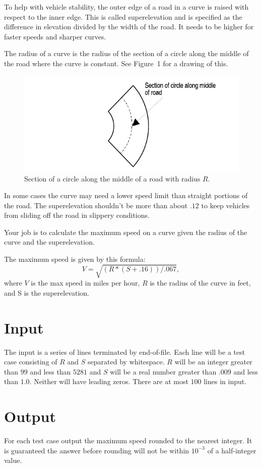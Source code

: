 
To help with vehicle stability, the outer edge of a road in a curve
is raised with respect to the inner edge. This is called superelevation
and is specified as the difference in elevation divided by the width 
of the road. It needs to be higher for faster speeds and sharper curves.

The radius of a curve is the radius of the section of a circle along the
middle of the road where the curve is constant. See Figure~1 for a
drawing of this.

\begin{figure}[h]
	\begin{center}
		\includegraphics[width=.65\textwidth]{F1CurveSpeed.pdf}
	\end{center}
	\caption{Section of a circle along the middle of a road with radius $R$.}
	\label{fig:1}
\end{figure}

In some cases the curve may need a lower speed limit than straight
portions of the road. The superelevation shouldn't be more than about
$.12$ to keep vehicles from sliding off the road in slippery conditions.

Your job is to calculate the maximum speed on a curve given the radius
of the curve and the superelevation.

The maximum speed is given by this formula:
$$V = \sqrt{(R*(S+.16))/.067},$$
where $V$ is the max speed in miles per hour, $R$ is the radius of the curve
in feet, and S is the superelevation.

\section*{Input}

The input is a series of lines terminated by end-of-file. Each line
will be a test case consisting of $R$ and $S$ separated by whitespace. $R$
will be an integer greater than $99$ and less than $5281$ and $S$ will be a 
real number greater than $.009$ and less than $1.0$. Neither will have 
leading zeros. There are at most $100$ lines in input.

\section*{Output}

For each test case output the maximum speed rounded to the nearest
integer. It is guaranteed the answer before rounding will not be within $10^{-3}$
of a half-integer value.